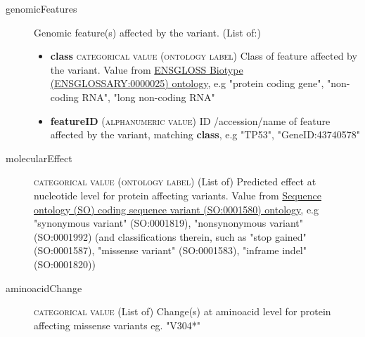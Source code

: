 \documentclass[a4paper, 10pt]{article}        %
\begin{document}
\begin{description}
	\item[genomicFeatures] Genomic feature(s) affected by the variant. (List of:)
	\begin{itemize}
			\item[]  \textbf{class} {\textsc{categorical value (ontology label)}} Class of feature affected by the variant. Value from \href{http://ensembl.org/glossary/ENSGLOSSARY_0000025}{ENSGLOSS Biotype (ENSGLOSSARY:0000025) ontology}, e.g "protein coding gene", "non-coding RNA", "long non-coding RNA"
			\item[]  \textbf{featureID} {\textsc{(alphanumeric value)}} ID /accession/name of feature affected by the variant, matching \textbf{class}, e.g "TP53", "GeneID:43740578"
	\end{itemize} 
	\item[molecularEffect] {\textsc{categorical value (ontology label)}} (List of) Predicted effect at nucleotide level for protein affecting variants. Value from \href{http://purl.obolibrary.org/obo/SO_0001580}{Sequence ontology (SO) coding sequence variant (SO:0001580) ontology}, e.g "synonymous variant" (SO:0001819), "nonsynonymous variant" (SO:0001992) (and classifications therein, such as "stop gained" (SO:0001587), "missense variant" (SO:0001583), "inframe indel" (SO:0001820))
	\item[aminoacidChange]  {\textsc{categorical value}} (List of) Change(s) at aminoacid level for protein affecting missense variants eg. "V304*"
	
 \end{description}



\end{document}

